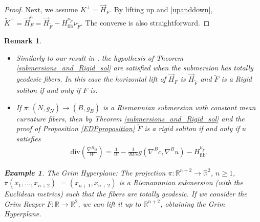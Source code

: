 \documentclass[12pt]{article}
\newtheorem{theorem}[lemma]{Theorem}
\newtheorem{examp}[lemma]{Example}
\newtheorem{remark}[lemma]{Remark}
\numberwithin{lemma}{section}
\newenvironment{example}[1]{\begin{examp} #1: %
\normalfont }{\end{examp}}
\newcommand{\R}{\mathbb{R}}
\begin{document}
{\begin{proof}
Next, we assume $K^{\perp}=\vec{H}_{F}$. By lifting up and \eqref{upanddown}, $\tilde{K}^{\perp}=\vec{H}_{F}^h=
\vec{H}_{\widetilde{F}} -H_{\mathrm{fib}}^{\nu_{\widetilde{F}}} \nu_{\widetilde{F}}$. The converse is also straightforward. 
\color{black}
\end{proof}
\begin{remark}\label{remark_submersion_PDE}
\begin{itemize}\normalfont 
\item[1)] Similarly to our result in \cite{LO}, the hypothesis of Theorem \ref{submersions_and_Rigid_sol} are satisfied when the submersion has totally geodesic fibers. In this case the horizontal lift of $\vec{H}_F$ is $\vec{H}_{\widetilde{F}}$ and $\widetilde{F}$ is a Rigid soliton if and only if $F$ is.
\item[2)] If $\pi:(N,g_N)\rightarrow (B,g_B)$ is a Riemannian submersion with constant mean curvature fibers, then by Theorem \ref{submersions_and_Rigid_sol} and the proof of Proposition \ref{EDPproposition} $\widetilde{F}$ is a rigid soliton if and only if $u$ satisfies
\begin{eqnarray}\label{PDE_rigid_submersion}
\mathrm{div}\left(\frac{\nabla^B u}{W}\right)=\frac{1}{W}-\frac{1}{2Wc}g(\nabla^B c,\nabla^B u)-H_{\mathrm{fib}}^{\nu_{\widetilde{F}}}.
\end{eqnarray}
\end{itemize}
\begin{example}{The Grim Hyperplane} The projection $\pi:\R^{n+2}\to \R^2$, $n\geq 1$, $\pi(x_1,\ldots,x_{n+2})$ $=(x_{n+1},x_{n+2})$ is a Riemannnian submersion (with the Euclidean metrics) such that the fibers are totally geodesic. If we consider the Grim Reaper $F:\R\to\R^2$, we can  lift it up to $\R^{n+2}$, obtaining the Grim Hyperplane.

\end{example}
\end{remark}}
\end{document}
